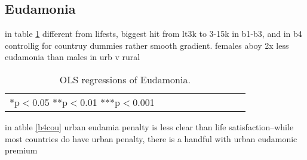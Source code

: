 \documentclass[10pt, letterpaper]{article}
\begin{document}
\begin{spacing}{1.4}
\subsection{Eudamonia}

in table \ref{regB} different from lifests, biggest hit from lt3k to 3-15k in b1-b3, and in b4
controllig for countruy dummies rather smooth gradient. females aboy 2x less
eudamonia than males in urb v rural

\begin{table}[H]\centering\caption{OLS regressions of Eudamonia.} \label{regB} \begin{scriptsize} \begin{tabular}{p{2.2in}p{.6in}p{.6in}p{.6in}p{.6in}|p{.6in}p{.6in}p{.6in}p{.6in}p{.6in}p{.6 in}p{.6in}p{.6 in}}\hline  \hline\multicolumn{4}{l}{*p$<$0.05 **p$<$0.01 ***p$<$0.001} \end{tabular}\end{scriptsize}\end{table}

in atble \ref{b4cou} urban eudamia penalty is less clear than life
satisfaction--while most countries do have urban penalty, there is a handful
with urban eudamonic premium



\end{spacing}
\end{document}
